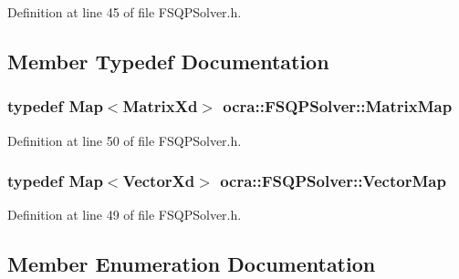 Definition at line 45 of file F\+S\+Q\+P\+Solver.\+h.



\subsection{Member Typedef Documentation}
\subsubsection[{\texorpdfstring{Matrix\+Map}{MatrixMap}}]{\setlength{\rightskip}{0pt plus 5cm}typedef Map$<$Matrix\+Xd$>$ {\bf ocra\+::\+F\+S\+Q\+P\+Solver\+::\+Matrix\+Map}}\hypertarget{classocra_1_1FSQPSolver_afe309d10ad5c6be082994d6df67e8be1}{}\label{classocra_1_1FSQPSolver_afe309d10ad5c6be082994d6df67e8be1}


Definition at line 50 of file F\+S\+Q\+P\+Solver.\+h.

\subsubsection[{\texorpdfstring{Vector\+Map}{VectorMap}}]{\setlength{\rightskip}{0pt plus 5cm}typedef Map$<$Vector\+Xd$>$ {\bf ocra\+::\+F\+S\+Q\+P\+Solver\+::\+Vector\+Map}}\hypertarget{classocra_1_1FSQPSolver_ac6ad3dde7fc6c45be397240743e4cd9b}{}\label{classocra_1_1FSQPSolver_ac6ad3dde7fc6c45be397240743e4cd9b}


Definition at line 49 of file F\+S\+Q\+P\+Solver.\+h.



\subsection{Member Enumeration Documentation}
